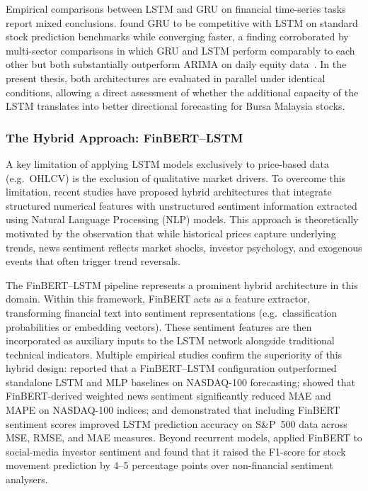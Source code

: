 \documentclass[12pt]{ucetd}
\begin{document}
Empirical comparisons between LSTM and GRU on financial time-series tasks report mixed conclusions. \citet{siami2019performance} found GRU to be competitive with LSTM on standard stock prediction benchmarks while converging faster, a finding corroborated by multi-sector comparisons in which GRU and LSTM perform comparably to each other but both substantially outperform ARIMA on daily equity data~\cite{yavasani2023comparative}. In the present thesis, both architectures are evaluated in parallel under identical conditions, allowing a direct assessment of whether the additional capacity of the LSTM translates into better directional forecasting for Bursa Malaysia stocks.

\subsubsection{The Hybrid Approach: FinBERT--LSTM}

A key limitation of applying LSTM models exclusively to price-based data (e.g.\ OHLCV) is the exclusion of qualitative market drivers. To overcome this limitation, recent studies have proposed hybrid architectures that integrate structured numerical features with unstructured sentiment information extracted using Natural Language Processing (NLP) models. This approach is theoretically motivated by the observation that while historical prices capture underlying trends, news sentiment reflects market shocks, investor psychology, and exogenous events that often trigger trend reversals.

The FinBERT--LSTM pipeline represents a prominent hybrid architecture in this domain. Within this framework, FinBERT acts as a feature extractor, transforming financial text into sentiment representations (e.g.\ classification probabilities or embedding vectors). These sentiment features are then incorporated as auxiliary inputs to the LSTM network alongside traditional technical indicators. Multiple empirical studies confirm the superiority of this hybrid design: \citet{halder2024finbert} reported that a FinBERT--LSTM configuration outperformed standalone LSTM and MLP baselines on NASDAQ-100 forecasting; \citet{gu2024predicting} showed that FinBERT-derived weighted news sentiment significantly reduced MAE and MAPE on NASDAQ-100 indices; and \citet{kim2023forecasting} demonstrated that including FinBERT sentiment scores improved LSTM prediction accuracy on S\&P~500 data across MSE, RMSE, and MAE measures. Beyond recurrent models, \citet{liu2023stock} applied FinBERT to social-media investor sentiment and found that it raised the F1-score for stock movement prediction by 4--5 percentage points over non-financial sentiment analysers.
\end{document}
